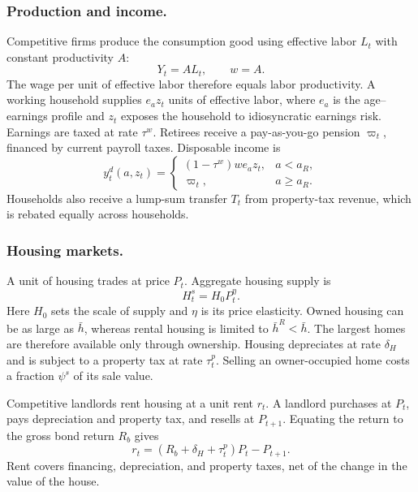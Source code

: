 \subsubsection*{Production and income.}
Competitive firms produce the consumption good using effective labor $L_t$
with constant productivity $A$:
\begin{equation}
 Y_t=A L_t,\qquad w=A.
 \label{eq:env-production}
\end{equation}
The wage per unit of effective labor therefore equals labor productivity.
A working household supplies $e_a z_t$ units of effective labor, where $e_a$
is the age--earnings profile and $z_t$ exposes the household to idiosyncratic
earnings risk. Earnings are taxed at rate $\tau^w$. Retirees receive a
pay-as-you-go pension $\varpi_t$, financed by current payroll taxes.
Disposable income is
\begin{equation}
 y_t^d(a,z_t)=
 \begin{cases}
 (1-\tau^w)w e_a z_t, & a<a_R,\\
 \varpi_t, & a\geq a_R.
 \end{cases}
 \label{eq:env-income}
\end{equation}
Households also receive a lump-sum transfer $T_t$ from property-tax revenue,
which is rebated equally across households.

\subsubsection*{Housing markets.}
A unit of housing trades at price $P_t$. Aggregate housing supply is
\begin{equation}
 H_t^s=H_0 P_t^{\eta}.
 \label{eq:env-housing-supply}
\end{equation}
Here $H_0$ sets the scale of supply and $\eta$ is its price elasticity.
Owned housing can be as large as $\bar h$, whereas rental housing is limited
to $\bar h^R<\bar h$. The largest homes are therefore available only through
ownership. Housing depreciates at rate $\delta_H$ and is subject to a
property tax at rate $\tau_t^p$. Selling an owner-occupied home costs a
fraction $\psi^s$ of its sale value.

Competitive landlords rent housing at a unit rent $r_t$. A landlord purchases
at $P_t$, pays depreciation and property tax, and resells at $P_{t+1}$.
Equating the return to the gross bond return $R_b$ gives
\begin{equation}
 r_t=(R_b+\delta_H+\tau_t^p)P_t-P_{t+1}.
 \label{eq:env-rent}
\end{equation}
Rent covers financing, depreciation, and property taxes, net of the change
in the value of the house.

